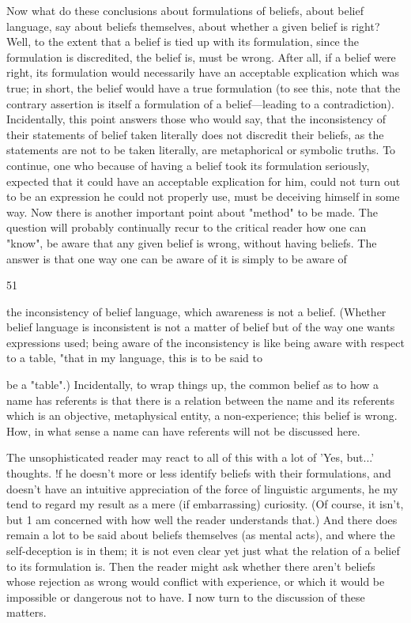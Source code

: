 \documentclass[10pt,twoside]{memoir}
\begin{document}
\begin{enumerate}
{{{{{{{{{{{{{{Now what do these conclusions about formulations of beliefs, about 
belief language, say about beliefs themselves, about whether a given belief is 
right? Well, to the extent that a belief is tied up with its formulation, since 
the formulation is discredited, the belief is, must be wrong. After all, if a 
belief were right, its formulation would necessarily have an acceptable 
explication which was true; in short, the belief would have a true 
formulation (to see this, note that the contrary assertion is itself a 
formulation of a belief---leading to a contradiction). Incidentally, this point 
answers those who would say, that the inconsistency of their statements of 
belief taken literally does not discredit their beliefs, as the statements are not 
to be taken literally, are metaphorical or symbolic truths. To continue, one 
who because of having a belief took its formulation seriously, expected that 
it could have an acceptable explication for him, could not turn out to be an 
expression he could not properly use, must be deceiving himself in some 
way. Now there is another important point about "method" to be made. 
The question will probably continually recur to the critical reader how one 
can "know", be aware that any given belief is wrong, without having beliefs. 
The answer is that one way one can be aware of it is simply to be aware of 


51 


the inconsistency of belief language, which awareness is not a belief. 
(Whether belief language is inconsistent is not a matter of belief but of the 
way one wants expressions used; being aware of the inconsistency is like 
being aware with respect to a table, "that in my language, this is to be said to 


be a "table".) Incidentally, to wrap things up, the common belief as to how 
a name has referents is that there is a relation between the name and its 
referents which is an objective, metaphysical entity, a non-experience; this 
belief is wrong. How, in what sense a name can have referents will not be 
discussed here. 

The unsophisticated reader may react to all of this with a lot of 'Yes, 
but...' thoughts. !f he doesn't more or less identify beliefs with their 
formulations, and doesn't have an intuitive appreciation of the force of 
linguistic arguments, he my tend to regard my result as a mere (if 
embarrassing) curiosity. (Of course, it isn't, but 1 am concerned with how 
well the reader understands that.) And there does remain a lot to be said 
about beliefs themselves (as mental acts), and where the self-deception is in 
them; it is not even clear yet just what the relation of a belief to its 
formulation is. Then the reader might ask whether there aren't beliefs whose 
rejection as wrong would conflict with experience, or which it would be 
impossible or dangerous not to have. I now turn to the discussion of these 
matters. 


}}}}}}}}}}}}}}
\end{enumerate}
\end{document}
